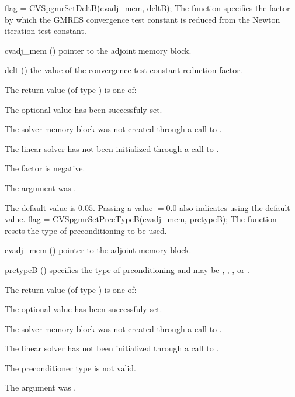 {
  flag = CVSpgmrSetDeltB(cvadj\_mem, deltB);
}
{
  The function  specifies the factor by
  which the GMRES convergence test constant is reduced
  from the Newton iteration test constant.
}
{
  \begin{args}
  \item[cvadj\_mem] ()
    pointer to the adjoint memory block.
  \item[delt] ()
    the value of the convergence test constant reduction factor.
  \end{args}
}
{
  The return value  (of type ) is one of:
  \begin{args}
  \item[\Id{CVSPGMR\_SUCCESS}] 
    The optional value has been successfuly set.
  \item[\Id{CVSPGMR\_MEM\_NULL}]
    The {\cvodes} solver memory block was not created through a call to .
  \item[\Id{CVSPGMR\_LMEM\_NULL}]
    The {\cvspgmr} linear solver has not been initialized through a call to .
  \item[\Id{CVSPGMR\_ILL\_INPUT}]
    The factor  is negative.  
  \item[\Id{CV\_ADJMEM\_NULL}]
    The  argument was .
  \end{args}
}
{
  The default value is $0.05$.
  Passing a value $ = 0.0$ also indicates using the default value.
}
{
  flag = CVSpgmrSetPrecTypeB(cvadj\_mem, pretypeB);
}
{
  The function  resets the type
  of preconditioning to be used.
}
{
  \begin{args}
  \item[cvadj\_mem] ()
    pointer to the adjoint memory block.
  \item[pretypeB] ()
    specifies the type of prconditioning and may be
    , , , or .
  \end{args}
}
{
  The return value  (of type ) is one of:
  \begin{args}
  \item[\Id{CVSPGMR\_SUCCESS}] 
    The optional value has been successfuly set.
  \item[\Id{CVSPGMR\_MEM\_NULL}]
    The {\cvodes} solver memory block was not created through a call to .
  \item[\Id{CVSPGMR\_LMEM\_NULL}]
    The {\cvspgmr} linear solver has not been initialized through a call to .
  \item[\Id{CVSPGMR\_ILL\_INPUT}]
    The preconditioner type  is not valid.
  \item[\Id{CV\_ADJMEM\_NULL}]
    The  argument was .
  \end{args}
}
